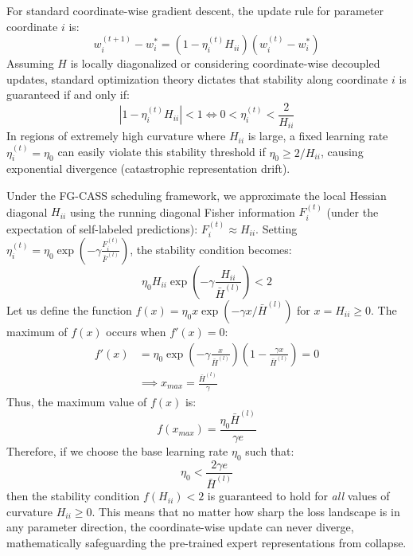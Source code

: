 \documentclass{article}
\theoremstyle{plain}
\theoremstyle{definition}
\theoremstyle{remark}
\begin{document}
For standard coordinate-wise gradient descent, the update rule for parameter coordinate $i$ is:
\begin{equation}
w_i^{(t+1)} - w_i^* = (1 - \eta_i^{(t)} H_{ii}) (w_i^{(t)} - w_i^*)
\end{equation}
Assuming $H$ is locally diagonalized or considering coordinate-wise decoupled updates, standard optimization theory dictates that stability along coordinate $i$ is guaranteed if and only if:
\begin{equation}
|1 - \eta_i^{(t)} H_{ii}| < 1 \iff 0 < \eta_i^{(t)} < \frac{2}{H_{ii}}
\end{equation}
In regions of extremely high curvature where $H_{ii}$ is large, a fixed learning rate $\eta_i^{(t)} = \eta_0$ can easily violate this stability threshold if $\eta_0 \ge 2/H_{ii}$, causing exponential divergence (catastrophic representation drift).

Under the FG-CASS scheduling framework, we approximate the local Hessian diagonal $H_{ii}$ using the running diagonal Fisher information $F_i^{(t)}$ (under the expectation of self-labeled predictions): $F_i^{(t)} \approx H_{ii}$. Setting $\eta_i^{(t)} = \eta_0 \exp\left(-\gamma \frac{F_i^{(t)}}{\bar{F}^{(l)}}\right)$, the stability condition becomes:
\begin{equation}
\eta_0 H_{ii} \exp\left(-\gamma \frac{H_{ii}}{\bar{H}^{(l)}}\right) < 2
\end{equation}
Let us define the function $f(x) = \eta_0 x \exp(-\gamma x / \bar{H}^{(l)})$ for $x = H_{ii} \ge 0$.
The maximum of $f(x)$ occurs when $f'(x) = 0$:
\begin{equation}
\begin{aligned}
f'(x) &= \eta_0 \exp\left(-\gamma \frac{x}{\bar{H}^{(l)}}\right) \left(1 - \frac{\gamma x}{\bar{H}^{(l)}}\right) = 0 \\
&\implies x_{max} = \frac{\bar{H}^{(l)}}{\gamma}
\end{aligned}
\end{equation}
Thus, the maximum value of $f(x)$ is:
\begin{equation}
f(x_{max}) = \frac{\eta_0 \bar{H}^{(l)}}{\gamma e}
\end{equation}
Therefore, if we choose the base learning rate $\eta_0$ such that:
\begin{equation}
\eta_0 < \frac{2 \gamma e}{\bar{H}^{(l)}}
\end{equation}
then the stability condition $f(H_{ii}) < 2$ is guaranteed to hold for \textit{all} values of curvature $H_{ii} \ge 0$. This means that no matter how sharp the loss landscape is in any parameter direction, the coordinate-wise update can never diverge, mathematically safeguarding the pre-trained expert representations from collapse.
\end{document}
